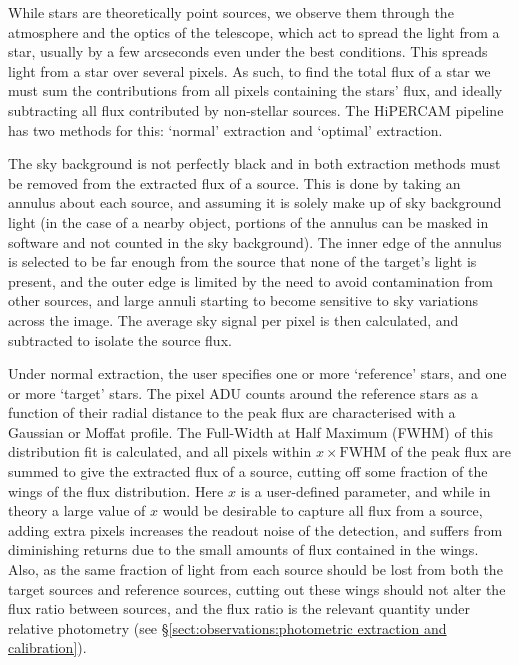 While stars are theoretically point sources, we observe them through the atmosphere and the optics of the telescope, which act to spread the light from a star, usually by a few arcseconds even under the best conditions. This spreads light from a star over several pixels. As such, to find the total flux of a star we must sum the contributions from all pixels containing the stars' flux, and ideally subtracting all flux contributed by non-stellar sources.
The HiPERCAM pipeline has two methods for this: `normal' extraction and `optimal' extraction.

The sky background is not perfectly black and in both extraction methods must be removed from the extracted flux of a source. This is done by taking an annulus about each source, and assuming it is solely make up of sky background light (in the case of a nearby object, portions of the annulus can be masked in software and not counted in the sky background).
The inner edge of the annulus is selected to be far enough from the source that none of the target's light is present, and the outer edge is limited by the need to avoid contamination from other sources, and large annuli starting to become sensitive to sky variations across the image.
The average sky signal per pixel is then calculated, and subtracted to isolate the source flux.

Under normal extraction, the user specifies one or more `reference' stars, and one or more `target' stars. The pixel ADU counts around the reference stars as a function of their radial distance to the peak flux are characterised with a Gaussian or Moffat profile. The Full-Width at Half Maximum (FWHM) of this distribution fit is calculated, and all pixels within $x \times \mathrm{FWHM}$ of the peak flux are summed to give the extracted flux of a source, cutting off some fraction of the wings of the flux distribution. Here $x$ is a user-defined parameter, and while in theory a large value of $x$ would be desirable to capture all flux from a source, adding extra pixels increases the readout noise of the detection, and suffers from diminishing returns due to the small amounts of flux contained in the wings.
Also, as the same fraction of light from each source should be lost from both the target sources and reference sources, cutting out these wings should not alter the flux ratio between sources, and the flux ratio is the relevant quantity under relative photometry (see \S\ref{sect:observations:photometric extraction and calibration}).

